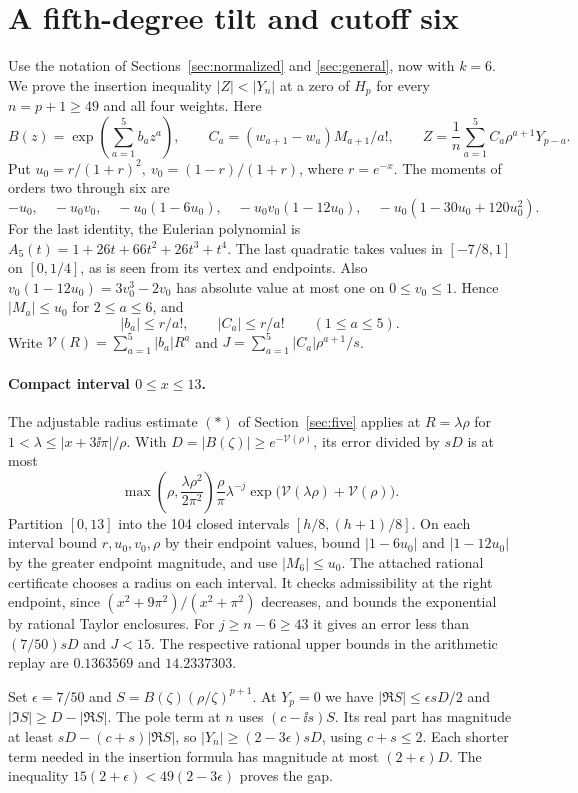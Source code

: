 \section{A fifth-degree tilt and cutoff six}\label{sec:six}

Use the notation of Sections~\ref{sec:normalized} and \ref{sec:general}, now with \(k=6\). We prove the insertion inequality \(|Z|<|Y_n|\) at a zero of \(H_p\) for every \(n=p+1\ge49\) and all four weights. Here
\[
 B(z)=\exp\!\left(\sum_{a=1}^5 b_a z^a\right),\qquad
 C_a=(w_{a+1}-w_a)M_{a+1}/a!,\qquad
 Z=\frac{1}{n}\sum_{a=1}^5 C_a\rho^{a+1}Y_{p-a}.
\]
Put \(u_0=r/(1+r)^2,\ v_0=(1-r)/(1+r)\), where \(r=e^{-x}\). The moments of orders two through six are
\[
 -u_0,\quad -u_0v_0,\quad -u_0(1-6u_0),\quad
 -u_0v_0(1-12u_0),\quad -u_0(1-30u_0+120u_0^2).
\]
For the last identity, the Eulerian polynomial is \(A_5(t)=1+26t+66t^2+26t^3+t^4\). The last quadratic takes values in \([-7/8,1]\) on \([0,1/4]\), as is seen from its vertex and endpoints. Also \(v_0(1-12u_0)=3v_0^3-2v_0\) has absolute value at most one on \(0\le v_0\le1\). Hence \(|M_a|\le u_0\) for \(2\le a\le6\), and
\[
 |b_a|\le r/a!,\qquad |C_a|\le r/a!\qquad(1\le a\le5).
\]
Write \(\mathcal V(R)=\sum_{a=1}^5 |b_a|R^a\) and \(J=\sum_{a=1}^5|C_a|\rho^{a+1}/s\).

\paragraph{Compact interval \(0\le x\le13\).}
The adjustable radius estimate \((*)\) of Section~\ref{sec:five} applies at \(R=\lambda\rho\) for \(1<\lambda\le|x+3\ii\pi|/\rho\). With \(D=|B(\zeta)|\ge e^{-\mathcal V(\rho)}\), its error divided by \(sD\) is at most
\[
 \max\!\left(\rho,\frac{\lambda\rho^2}{2\pi^2}\right)
 \frac{\rho}{\pi}\lambda^{-j}
       \exp\!\bigl(\mathcal V(\lambda\rho)+\mathcal V(\rho)\bigr).
\]
Partition \([0,13]\) into the 104 closed intervals \([h/8,(h+1)/8]\). On each interval bound \(r,u_0,v_0,\rho\) by their endpoint values, bound \(|1-6u_0|\) and \(|1-12u_0|\) by the greater endpoint magnitude, and use \(|M_6|\le u_0\). The attached rational certificate chooses a radius on each interval. It checks admissibility at the right endpoint, since \((x^2+9\pi^2)/(x^2+\pi^2)\) decreases, and bounds the exponential by rational Taylor enclosures. For \(j\ge n-6\ge43\) it gives an error less than \((7/50)sD\) and \(J<15\). The respective rational upper bounds in the arithmetic replay are \(0.1363569\) and \(14.2337303\).

Set \(\epsilon=7/50\) and \(S=B(\zeta)(\rho/\zeta)^{p+1}\). At \(Y_p=0\) we have \(|\Re S|\le\epsilon sD/2\) and \(|\Im S|\ge D-|\Re S|\). The pole term at \(n\) uses \((c-\ii s)S\). Its real part has magnitude at least \(sD-(c+s)|\Re S|\), so \(|Y_n|\ge (2-3\epsilon)sD\), using \(c+s\le2\). Each shorter term needed in the insertion formula has magnitude at most \((2+\epsilon)D\). The inequality \(15(2+\epsilon)<49(2-3\epsilon)\) proves the gap.

